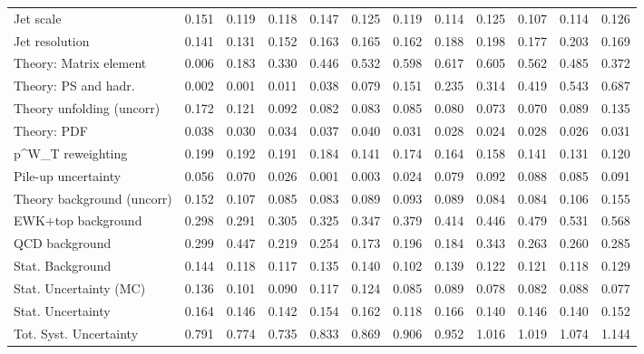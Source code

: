 \begin{tabular}{l|p{0.6cm}p{0.6cm}p{0.6cm}p{0.6cm}p{0.6cm}p{0.6cm}p{0.6cm}p{0.6cm}p{0.6cm}p{0.6cm}p{0.6cm}}
Jet scale                                & 0.151 & 0.119 & 0.118 & 0.147 & 0.125 & 0.119 & 0.114 & 0.125 & 0.107 & 0.114 & 0.126 \\
Jet resolution                           & 0.141 & 0.131 & 0.152 & 0.163 & 0.165 & 0.162 & 0.188 & 0.198 & 0.177 & 0.203 & 0.169 \\
Theory: Matrix element                   & 0.006 & 0.183 & 0.330 & 0.446 & 0.532 & 0.598 & 0.617 & 0.605 & 0.562 & 0.485 & 0.372 \\
Theory: PS and hadr.                     & 0.002 & 0.001 & 0.011 & 0.038 & 0.079 & 0.151 & 0.235 & 0.314 & 0.419 & 0.543 & 0.687 \\
Theory unfolding (uncorr)                & 0.172 & 0.121 & 0.092 & 0.082 & 0.083 & 0.085 & 0.080 & 0.073 & 0.070 & 0.089 & 0.135 \\
Theory: PDF                              & 0.038 & 0.030 & 0.034 & 0.037 & 0.040 & 0.031 & 0.028 & 0.024 & 0.028 & 0.026 & 0.031 \\
p^{W}_{T} reweighting                    & 0.199 & 0.192 & 0.191 & 0.184 & 0.141 & 0.174 & 0.164 & 0.158 & 0.141 & 0.131 & 0.120 \\
Pile-up uncertainty                      & 0.056 & 0.070 & 0.026 & 0.001 & 0.003 & 0.024 & 0.079 & 0.092 & 0.088 & 0.085 & 0.091 \\
Theory background (uncorr)               & 0.152 & 0.107 & 0.085 & 0.083 & 0.089 & 0.093 & 0.089 & 0.084 & 0.084 & 0.106 & 0.155 \\
EWK+top background                       & 0.298 & 0.291 & 0.305 & 0.325 & 0.347 & 0.379 & 0.414 & 0.446 & 0.479 & 0.531 & 0.568 \\
QCD background                           & 0.299 & 0.447 & 0.219 & 0.254 & 0.173 & 0.196 & 0.184 & 0.343 & 0.263 & 0.260 & 0.285 \\
Stat. Background                         & 0.144 & 0.118 & 0.117 & 0.135 & 0.140 & 0.102 & 0.139 & 0.122 & 0.121 & 0.118 & 0.129 \\
Stat. Uncertainty (MC)                   & 0.136 & 0.101 & 0.090 & 0.117 & 0.124 & 0.085 & 0.089 & 0.078 & 0.082 & 0.088 & 0.077 \\
\hline
Stat. Uncertainty                        & 0.164 & 0.146 & 0.142 & 0.154 & 0.162 & 0.118 & 0.166 & 0.140 & 0.146 & 0.140 & 0.152 \\
\hline
Tot. Syst. Uncertainty                   & 0.791 & 0.774 & 0.735 & 0.833 & 0.869 & 0.906 & 0.952 & 1.016 & 1.019 & 1.074 & 1.144 \\
\hline
\end{tabular}
